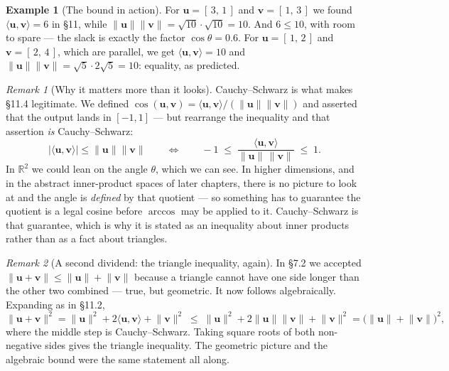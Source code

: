 \documentclass[11pt]{article}
\theoremstyle{definition}
\newtheorem{ex}{Example}[section]
\theoremstyle{remark}
\newtheorem*{rmk}{Remark}
\newcommand{\R}{\mathbb{R}}
\newcommand{\vc}[1]{\mathbf{#1}}
\newcommand{\norm}[1]{\lVert #1\rVert}
\begin{document}
\begin{ex}[The bound in action]
For $\vc{u}=[\,3,\,1\,]$ and $\vc{v}=[\,1,\,3\,]$ we found
$\langle\vc{u},\vc{v}\rangle=6$ in \S11, while
$\norm{\vc{u}}\norm{\vc{v}}=\sqrt{10}\cdot\sqrt{10}=10$. And $6\le10$, with
room to spare --- the slack is exactly the factor $\cos\theta=0.6$. For
$\vc{u}=[\,1,\,2\,]$ and $\vc{v}=[\,2,\,4\,]$, which are parallel, we get
$\langle\vc{u},\vc{v}\rangle=10$ and
$\norm{\vc{u}}\norm{\vc{v}}=\sqrt5\cdot2\sqrt5=10$: equality, as predicted.
\end{ex}

\begin{rmk}[Why it matters more than it looks]
Cauchy--Schwarz is what makes \S11.4 legitimate. We defined
$\cos(\vc{u},\vc{v})=\langle\vc{u},\vc{v}\rangle/(\norm{\vc{u}}\norm{\vc{v}})$
and asserted that the output lands in $[-1,1]$ --- but rearrange the inequality
and that assertion \emph{is} Cauchy--Schwarz:
\[
  \bigl\lvert\langle\vc{u},\vc{v}\rangle\bigr\rvert\le\norm{\vc{u}}\norm{\vc{v}}
  \qquad\Longleftrightarrow\qquad
  -1 \;\le\; \frac{\langle\vc{u},\vc{v}\rangle}{\norm{\vc{u}}\,\norm{\vc{v}}} \;\le\; 1 .
\]
In $\R^{2}$ we could lean on the angle $\theta$, which we can see. In higher
dimensions, and in the abstract inner-product spaces of later chapters, there is
no picture to look at and the angle is \emph{defined} by that quotient --- so
something has to guarantee the quotient is a legal cosine before $\arccos$ may
be applied to it. Cauchy--Schwarz is that guarantee, which is why it is stated
as an inequality about inner products rather than as a fact about triangles.
\end{rmk}

\begin{rmk}[A second dividend: the triangle inequality, again]
In \S7.2 we accepted $\norm{\vc{u}+\vc{v}}\le\norm{\vc{u}}+\norm{\vc{v}}$
because a triangle cannot have one side longer than the other two combined ---
true, but geometric. It now follows algebraically. Expanding as in \S11.2,
\[
  \norm{\vc{u}+\vc{v}}^{2}
  = \norm{\vc{u}}^{2}+2\langle\vc{u},\vc{v}\rangle+\norm{\vc{v}}^{2}
  \;\le\; \norm{\vc{u}}^{2}+2\norm{\vc{u}}\norm{\vc{v}}+\norm{\vc{v}}^{2}
  = \bigl(\norm{\vc{u}}+\norm{\vc{v}}\bigr)^{2},
\]
where the middle step is Cauchy--Schwarz. Taking square roots of both
non-negative sides gives the triangle inequality. The geometric picture and the
algebraic bound were the same statement all along.
\end{rmk}

\end{document}
